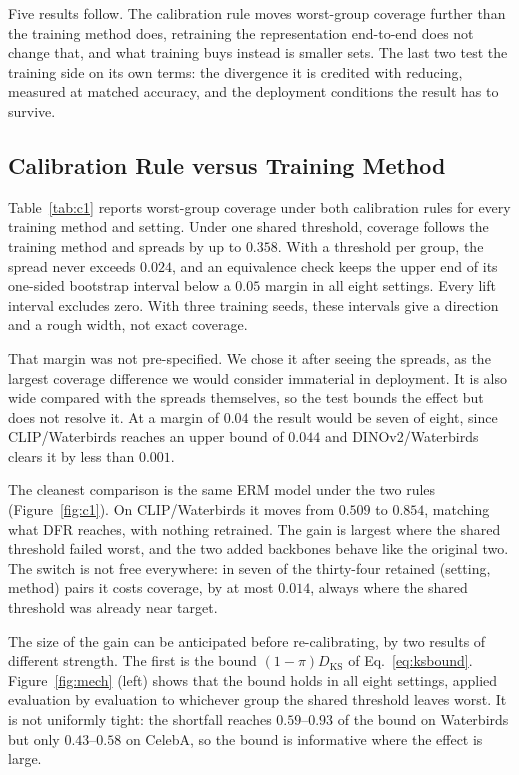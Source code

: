\documentclass[pdflatex,sn-basic]{sn-jnl}%
\theoremstyle{thmstyleone}%
\begin{document}
Five results follow. The calibration rule moves worst-group coverage further than the training
method does, retraining the representation end-to-end does not change that, and what training buys
instead is smaller sets. The last two test the training side on its own terms: the
divergence it is credited with reducing, measured at matched accuracy, and the deployment
conditions the result has to survive.

\subsection{Calibration Rule versus Training Method}
\label{sec:c1}

Table~\ref{tab:c1} reports worst-group coverage under both calibration rules for every
training method and setting. Under one shared threshold, coverage follows the training method and
spreads by up to $0.358$. With a threshold per group, the spread never exceeds $0.024$, and an
equivalence check keeps the upper end of its one-sided bootstrap interval below a $0.05$ margin in
all eight settings.
Every lift interval excludes zero. With three training seeds, these intervals give a direction and
a rough width, not exact coverage.

That margin was not pre-specified. We chose it after seeing the spreads, as the largest coverage
difference we would consider immaterial in deployment. It is also wide compared with the spreads
themselves, so the test bounds the effect but does not resolve it. At a margin of $0.04$ the result
would be seven of eight, since CLIP/Waterbirds reaches an upper bound of $0.044$ and
DINOv2/Waterbirds clears it by less than $0.001$.

The cleanest comparison is the same ERM model under the two rules
(Figure~\ref{fig:c1}). On CLIP/Waterbirds it moves from $0.509$ to $0.854$, matching
what DFR reaches, with nothing retrained. The gain is largest where the shared
threshold failed worst, and the two added backbones behave like the original two. The switch is not
free everywhere: in seven of the thirty-four retained (setting, method) pairs it costs coverage, by
at most $0.014$, always where the shared threshold was already near target.

The size of the gain can be anticipated before re-calibrating, by two results of different
strength. The first is the bound $(1-\pi)D_{\mathrm{KS}}$ of Eq.~\eqref{eq:ksbound}.
Figure~\ref{fig:mech} (left) shows
that the bound holds in all eight settings, applied evaluation by evaluation to whichever group the
shared threshold leaves worst. It is not uniformly tight: the shortfall reaches $0.59$--$0.93$ of the bound
on Waterbirds but only $0.43$--$0.58$ on CelebA, so the bound is informative where the effect is
large.
\end{document}
